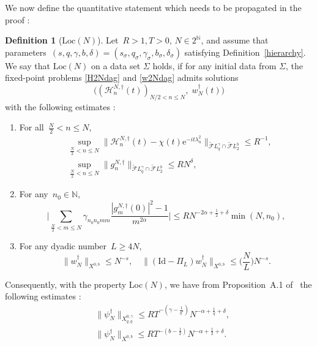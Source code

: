 \documentclass[11pt,reqno,english]{amsart}
\numberwithin{equation}{section}
\theoremstyle{plain}
\theoremstyle{definition}
\newtheorem{definition}[theorem]{Definition}
\theoremstyle{remark}
\newcommand{\N}{\mathbb{N}}
\newcommand{\e}{\mathrm{e}}
\begin{document}
We now define the quantitative statement which needs to be propagated in the proof :
\begin{definition}[$\mathrm{Loc}(N)$]\label{Databound}
	Let~$R>1, T>0$, $N\in 2^{\N}$, and assume that parameters~$(s,q,\gamma,b,\delta)=(s_{\sigma},q_{\sigma},\gamma_{\sigma},b_{\sigma},\delta_{\sigma})$ satisfying Definition~\ref{hierarchy}. We say that $\mathrm{Loc}(N)$ on a data set $\Sigma$ holds, if for any initial data from $\Sigma$, the fixed-point problems  \eqref{H2Ndag} and \eqref{w2Ndag} admits solutions
	$$ \big( (\mathcal{H}_n^{N,\dag}(t))_{N/2<n\leq N},\; w_N^{\dag}(t) \big)
	$$
	with
	 the following estimates :
	\begin{enumerate}
		\item For all~$\frac{N}{2}<n\leq N$,
		\begin{align}\label{R-bound3}
		&	\sup_{\frac{N}{2}<n\leq N}\|\mathcal{H}^{N,\dag}_n(t)-\chi(t)\e^{-it\lambda_n^2}\|_{\widetilde{\mathcal{F}}L_q^{\gamma}
				\cap\widetilde{\mathcal{F}}L_2^b
			}\leq R^{-1},\\
&			\sup_{\frac{N}{2}<n\leq N}\|g_{n}^{N,\dag}\|_{\widetilde{\mathcal{F}}L_q^{\gamma}
				\cap\widetilde{\mathcal{F}}L_2^b
			}\leq RN^{\delta},
		\end{align}
		\item For any~$n_0\in\N$,
		\begin{equation}\label{R-bound2}
			\Big|\sum_{\frac{N}{2}<m\leq N}\gamma_{n_0n_0mm}\frac{|g_m^{N,\dag}(0)|^2-1}{m^{2\alpha}}\Big|\leq RN^{-2\alpha+\frac{1}{2}+\delta}\min(N,n_0),
		\end{equation}
		\item For any dyadic number~$L\geq 4N$,
		\begin{equation}\label{R-bound1}
			\|w_N^{\dag}\|_{X^{0,b}}\leq N^{-s}, \quad \|(\mathrm{Id}-\Pi_L)w_N^{\dag}\|_{X^{0,b}}\leq \big(\frac{N}{L}\big)N^{-s}.
		\end{equation}
	\end{enumerate}
\end{definition}

Consequently, with the property Loc$(N)$, we have from Proposition~A.1 of~\cite{BCST24} the following estimates :
\begin{align}\label{R-bound'}
	&\|\psi_N^{\dag}\|_{X_{q,q}^{0,\gamma}}\leq RT^{-(\gamma-\frac{1}{q'})}N^{-\alpha+\frac{1}{q}+\delta},\\  &\|\psi_N^{\dag}\|_{X^{0,b}}\leq RT^{-(b-\frac{1}{2})}N^{-\alpha+\frac{1}{2}+\delta}.
\end{align}
\end{document}

